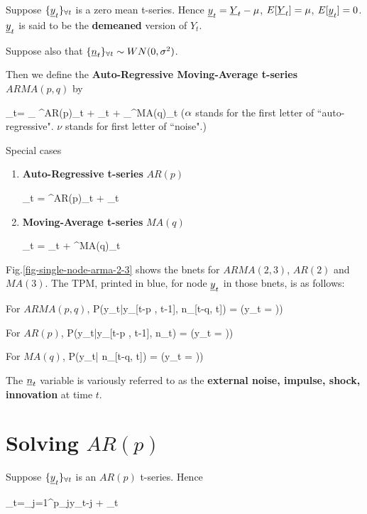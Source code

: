 Suppose ${\{{\underline{y}}_t\}_{\forall t}}$
is a zero mean t-series. Hence
${\underline{y}}_t= {\underline{Y}}_t-\mu$, 
$E[{\underline{Y}}_t]=\mu$,
$E[{\underline{y}}_t]=0$. 
${\underline{y}}_t$ is said to be the {\bf demeaned}
version of $Y_t$.

Suppose also that
${\{{\underline{n}}_t\}_{\forall t}}\sim WN(0, \sigma^2)$. 

Then we define the
{\bf Auto-Regressive Moving-Average 
t-series} $ARMA(p,q)$ by

\beq
\rvy_t=
_
{\caly^{AR(p)}_t}
+ \rvn_t +
_{\caly^{MA(q)}_t}
\label{eq-arma-def}
\eeq($\alpha$ stands for 
the first  letter
of ``auto-regressive".
$\nu$ stands for first
 letter of ``noise".)


Special cases
\begin{enumerate}
\item  {\bf Auto-Regressive t-series} $AR(p)$

\beq
\rvy_t =
\caly^{AR(p)}_t
+ \rvn_t
\label{eq-ar-def}
\eeq

\item {\bf Moving-Average t-series}
 $MA(q)$ 

\beq
\rvy_t = \rvn_t  +
\caly^{MA(q)}_t
\label{eq-ma-def}
\eeq
\end{enumerate}




 Fig.\ref{fig-single-node-arma-2-3}
shows the bnets for 
$ARMA(2,3)$, $AR(2)$ and $MA(3)$.
The TPM, printed in blue,
for node ${\underline{y}}_t$
in those bnets,
is as follows:

For $ARMA(p,q)$, 
\beq\color{blue}
P(y_t|y_{[t-p   , t-1]}, 
n_{[t-q, t]})
=
\indi(y_t = ))
\eeq

For $AR(p)$, 
\beq\color{blue}
P(y_t|y_{[t-p   , t-1]}, 
n_{t})
=
\indi(y_t = ))
\eeq

For $MA(q)$,
\beq\color{blue}
P(y_t| 
n_{[t-q, t]})
=
\indi(y_t = ))
\eeq



The ${\underline{n}}_t$ variable
is variously referred to as the
{\bf external noise, impulse,
shock, innovation}
at time $t$.

\section{Solving $AR(p)$}

Suppose ${\{{\underline{y}}_t\}_{\forall t}}$ is an $AR(p)$
t-series. Hence

\beq
\rvy_t=\sum_{j=1}^p\alp_jy_{t-j} + \rvn_t
\eeq


